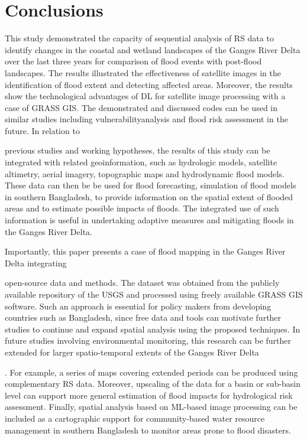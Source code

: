 \documentclass[water,article,accept,pdftex,oneauhor]{Definitions/mdpi}
\begin{document}
\section{Conclusions}
This study demonstrated the capacity of sequential analysis of RS data to identify changes in the coastal and wetland landscapes of the Ganges River Delta over the last three years{ }for comparison of flood events with post-flood landscapes. The results illustrated the effectiveness of satellite images in the identification of flood extent and detecting affected areas. Moreover, the results show the technological advantages of DL for satellite image processing with a case of GRASS GIS. {The} demonstrated and discussed codes can be used in similar studies including vulnerability{analysis} and flood risk assessment in the future. In relation to {previous studies and{ }working hypotheses, the results of {this} study can be integrated with related {geoinformation}, such as hydrologic models, satellite altimetry, aerial imagery{,} topographic maps {and }hydrodynamic flood models. These data can then be be used for flood forecasting, simulation of flood models in southern Bangladesh, to provide information on the spatial extent of flooded areas and to estimate possible impacts of floods. The integrated use of such information is useful in undertaking adaptive measures and mitigating floods in the Ganges River Delta.

Importantly, this paper presents a case of flood mapping in the Ganges River Delta integrating {open-source data and methods. The dataset was obtained from the publicly available repository of the USGS and processed using freely available GRASS GIS software. Such an approach is essential for{ }policy makers from developing countries such as Bangladesh, since free data and tools can motivate further studies to continue and expand spatial analysis using the proposed techniques. In future studies involving environmental monitoring, this research can be further extended for larger spatio-temporal extents of the Ganges River Delta{. For example, a series of maps covering extended periods can be produced using complementary RS data. Moreover, upscaling of the data for a basin or sub-basin level can support more general estimation of flood impacts for hydrological risk assessment. Finally, spatial analysis based on ML-based image processing can be included as a cartographic support for community-based water resource management in southern Bangladesh to monitor areas prone to flood disasters.

}}}
\end{document}
